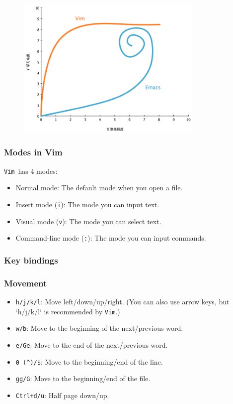 \documentclass[12pt]{ctexart}
\begin{document}
\begin{figure}[H]
    \centering
    \includegraphics[width=0.8\textwidth,keepaspectratio]{assets/Linux/2.9 Having heard Dao in the morning/1.png}
\end{figure}

\subsubsection{\textbf{Modes in Vim}}

\texttt{Vim}\ has 4 modes:

\begin{itemize}[itemsep=0pt, parsep=0pt, topsep=0pt, partopsep=0pt]
\item Normal mode: The default mode when you open a file.
\item Insert mode (\texttt{i}): The mode you can input text.
\item Visual mode (\texttt{v}): The mode you can select text.
\item Command-line mode (\texttt{:}): The mode you can input commands.
\end{itemize}

\subsubsection{\textbf{Key bindings}}

\subsubsection*{\textbf{Movement}}
\begin{itemize}[itemsep=0pt, parsep=0pt, topsep=0pt, partopsep=0pt]
\item \texttt{h/j/k/l}: Move left/down/up/right. (You can also use arrow keys, but `h/j/k/l` is recommended by \texttt{Vim}.) 
\item \texttt{w/b}: Move to the beginning of the next/previous word.
\item \texttt{e/Ge}: Move to the end of the next/previous word.
\item \verb|0 (^)/$|: Move to the beginning/end of the line.
\item \texttt{gg/G}: Move to the beginning/end of the file.
\item \texttt{Ctrl+d/u}: Half page down/up.
\end{itemize}
\end{document}
